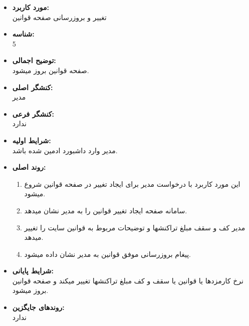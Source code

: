 \documentclass{article}
\begin{document}
\noindent\makebox[\linewidth]{\rule{\paperwidth}{0.4pt}}
\begin{itemize}
\item \textbf{مورد کاربرد:}\\
تغییر و بروزرسانی صفحه قوانین
\item \textbf{شناسه:}\\
5
\item \textbf{توضیح اجمالی:}\\
صفحه قوانین بروز میشود.
\item \textbf{کنشگر اصلی:}\\
مدیر
\item \textbf{کنشگر فرعی:}\\
ندارد
\item \textbf{شرایط اولیه:}\\
مدیر وارد داشبورد ادمین شده باشد.
\item \textbf{روند اصلی:}\\
\begin{enumerate}
\item  این مورد کاربرد با درخواست مدیر برای ایجاد تغییر در صفحه قوانین شروع میشود.
\item سامانه صفحه  ایجاد تغییر قوانین را به مدیر نشان میدهد.
\item مدیر کف و سقف مبلغ تراکنشها و توضیحات مربوط به قوانین سایت را تغییر میدهد.
\item پیغام بروزرسانی موفق قوانین به مدیر نشان داده میشود.
\end{enumerate}
\item \textbf{شرایط پایانی:}\\ 
نرخ کارمزدها یا قوانین یا سقف و کف مبلغ تراکنشها تغییر میکند و صفحه قوانین بروز میشود.
\item \textbf{روندهای جایگزین:}\\
ندارد
\end{itemize}

\noindent\makebox[\linewidth]{\rule{\paperwidth}{0.4pt}}
\end{document}
